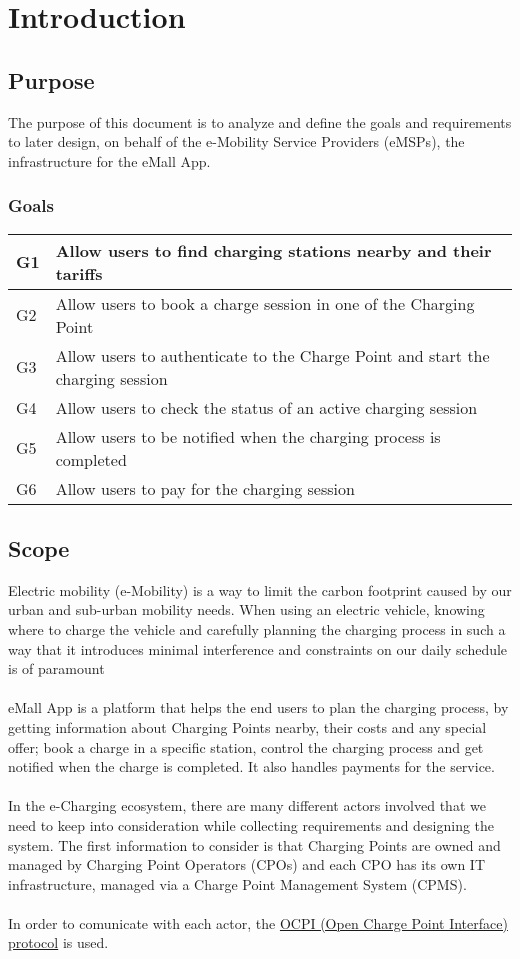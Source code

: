 \chapter{Introduction}
\section{Purpose}
The purpose of this document is to analyze and define the goals and requirements to later design, on behalf of the e-Mobility Service Providers (eMSPs), the infrastructure for the eMall App.

\subsection{Goals}
\begin{tabular}{ |l|l| } 
 \hline
G1 & Allow users to find charging stations nearby and their tariffs\\
 \hline
G2 & Allow users to book a charge session in one of the Charging Point\\
 \hline
G3 & Allow users to authenticate to the Charge Point and start the charging session\\
 \hline
G4 & Allow users to check the status of an active charging session\\
 \hline
G5 & Allow users to be notified when the charging process is completed\\
 \hline
G6 & Allow users to pay for the charging session\\
 \hline
\end{tabular}

\section{Scope}
Electric mobility (e-Mobility) is a way to limit the carbon footprint caused by our urban and sub-urban mobility needs. When using an electric vehicle, knowing where to charge the vehicle and carefully planning the charging process in such a way that it introduces minimal interference and constraints on our daily schedule is of paramount \\\\
eMall App is a platform that helps the end users to plan the charging process, by getting information about Charging Points nearby, their costs and any special offer; book a charge in a specific station, control the charging process and get notified when the charge is completed. It also handles payments for the service.\\\\
In the e-Charging ecosystem, there are many different actors involved that we need to keep into consideration while collecting requirements and designing the system. The first information to consider is that Charging Points are owned and managed by Charging Point Operators (CPOs) and each CPO has its own IT infrastructure, managed via a Charge Point Management System (CPMS). \\\\
In order to comunicate with each actor, the 
\href{../Specs/OCPI-2.2.1.pdf}{OCPI (Open Charge Point Interface) protocol} is used.

